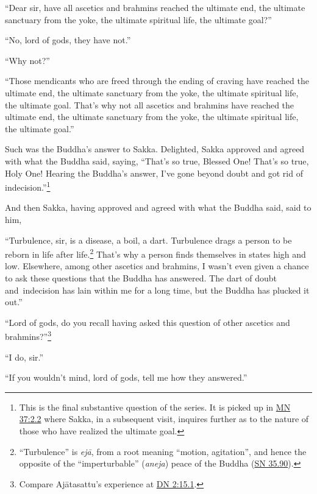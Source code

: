 \documentclass[12pt,openany]{book}%
\begin{document}
“Dear sir, have all ascetics and brahmins reached the ultimate end, the ultimate sanctuary from the yoke, the ultimate spiritual life, the ultimate goal?” 

“No, lord of gods, they have not.” 

“Why not?” 

“Those mendicants who are freed through the ending of craving have reached the ultimate end, the ultimate sanctuary from the yoke, the ultimate spiritual life, the ultimate goal. That’s why not all ascetics and brahmins have reached the ultimate end, the ultimate sanctuary from the yoke, the ultimate spiritual life, the ultimate goal.” 

Such was the Buddha’s answer to Sakka. Delighted, Sakka approved and agreed with what the Buddha said, saying, “That’s so true, Blessed One! That’s so true, Holy One! Hearing the Buddha’s answer, I’ve gone beyond doubt and got rid of indecision.”\footnote{This is the final substantive question of the series. It is picked up in \href{https://suttacentral.net/mn37/en/sujato\#2.2}{MN 37:2.2} where Sakka, in a subsequent visit, inquires further as to the nature of those who have realized the ultimate goal. } 

And then Sakka, having approved and agreed with what the Buddha said, said to him, 

“Turbulence, sir, is a disease, a boil, a dart. Turbulence drags a person to be reborn in life after life.\footnote{“Turbulence” is \textit{\textsanskrit{ejā}}, from a root meaning “motion, agitation”, and hence the opposite of the “imperturbable” (\textit{aneja}) peace of the Buddha (\href{https://suttacentral.net/sn35.90/en/sujato}{SN 35.90}). } That’s why a person finds themselves in states high and low. Elsewhere, among other ascetics and brahmins, I wasn’t even given a chance to ask these questions that the Buddha has answered. The dart of doubt and indecision has lain within me for a long time, but the Buddha has plucked it out.” 

“Lord of gods, do you recall having asked this question of other ascetics and brahmins?”\footnote{Compare \textsanskrit{Ajātasattu}’s experience at \href{https://suttacentral.net/dn2/en/sujato\#15.1}{DN 2:15.1}. } 

“I do, sir.” 

“If you wouldn’t mind, lord of gods, tell me how they answered.” 
\end{document}
